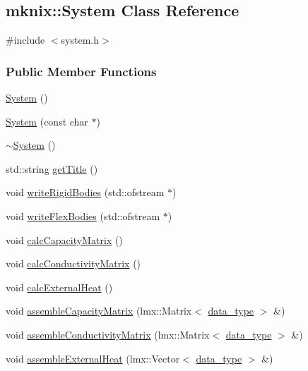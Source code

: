 \hypertarget{classmknix_1_1_system}{\subsection{mknix\-:\-:System Class Reference}
\label{classmknix_1_1_system}
}


{\ttfamily \#include $<$system.\-h$>$}

\subsubsection*{Public Member Functions}
\begin{DoxyCompactItemize}
\item 
\hyperlink{classmknix_1_1_system_ac1dd2687f5f064df189533aded56583c}{System} ()
\item 
\hyperlink{classmknix_1_1_system_a130c8a7c07bd06eaab9cad02b2003c1a}{System} (const char $\ast$)
\item 
\hyperlink{classmknix_1_1_system_a2edabe7efbc4e1c07efe75e635f3469d}{$\sim$\-System} ()
\item 
std\-::string \hyperlink{classmknix_1_1_system_a5315a33bb61855c178110b2998783ee3}{get\-Title} ()
\item 
void \hyperlink{classmknix_1_1_system_a848d086b44d1a4d656cb6357a738188b}{write\-Rigid\-Bodies} (std\-::ofstream $\ast$)
\item 
void \hyperlink{classmknix_1_1_system_aa68577edc1818bbe8d4bd9b6f716b5de}{write\-Flex\-Bodies} (std\-::ofstream $\ast$)
\item 
void \hyperlink{classmknix_1_1_system_a062011eba2b5bd9399705f9e725af4e8}{calc\-Capacity\-Matrix} ()
\item 
void \hyperlink{classmknix_1_1_system_a0336b3ae44843b0f48d1490072a6fb5f}{calc\-Conductivity\-Matrix} ()
\item 
void \hyperlink{classmknix_1_1_system_a8c01b52d2f2fb7de0ac6e1c64bda81a3}{calc\-External\-Heat} ()
\item 
void \hyperlink{classmknix_1_1_system_a354c0df800fe9729c73f7260d76273df}{assemble\-Capacity\-Matrix} (lmx\-::\-Matrix$<$ \hyperlink{namespacemknix_a16be4b246fbf2cceb141e3a179111020}{data\-\_\-type} $>$ \&)
\item 
void \hyperlink{classmknix_1_1_system_a6345dce07d1da92c969608340be7a604}{assemble\-Conductivity\-Matrix} (lmx\-::\-Matrix$<$ \hyperlink{namespacemknix_a16be4b246fbf2cceb141e3a179111020}{data\-\_\-type} $>$ \&)
\item 
void \hyperlink{classmknix_1_1_system_aa32a7ce62666f3a93c4448d2f70ccac8}{assemble\-External\-Heat} (lmx\-::\-Vector$<$ \hyperlink{namespacemknix_a16be4b246fbf2cceb141e3a179111020}{data\-\_\-type} $>$ \&)

\end{DoxyCompactItemize}
